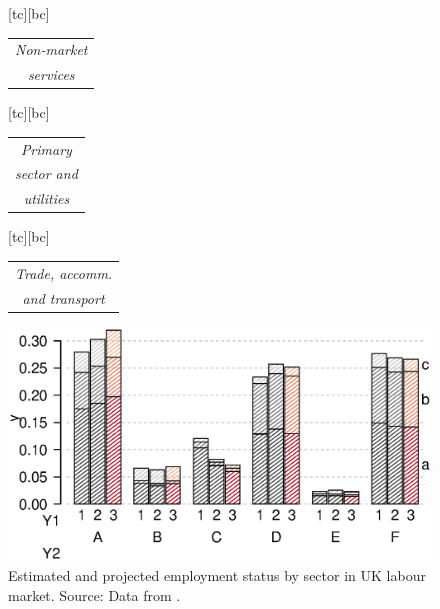 \documentclass[11 pt, a4paper]{report}
\begin{document}
\begin{figure}[hbtp!]
[tc][bc]{\scriptsize{
\begin{tabular}{c}
\emph{Non-market}\\
\emph{services}
\end{tabular}
}}
[tc][bc]{\scriptsize{
\begin{tabular}{c}
\emph{Primary }\\
\emph{sector and }\\
\emph{utilities}
\end{tabular}
}}
[tc][bc]{\scriptsize{
\begin{tabular}{c}
\emph{Trade, accomm.}\\
\emph{and transport}
\end{tabular}
}}
\centering
\includegraphics[width=\textwidth]{../figures/Fig5.8.eps}
\caption{Estimated and projected employment status by sector in UK labour market. Source: Data from \citet{Wilson2014}.}\label{Fig:59}
\end{figure}
\end{document}
